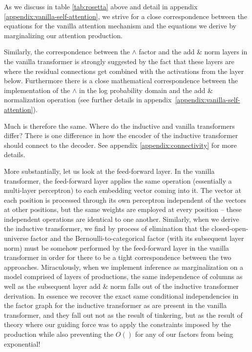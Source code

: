 \documentclass{article}
\begin{document}
As we discuss in table \ref{tab:rosetta} above and detail in appendix \ref{appendix:vanilla-self-attention}, we strive for a close correspondence between the equations for the vanilla attention mechanism and the equations we derive by marginalizing our attention production.

Similarly, the correspondence between the $\land$ factor and the add \& norm layers in the vanilla transformer is strongly suggested by the fact that these layers are where the residual connections get combined with the activations from the layer below.  Furthermore there is a close mathematical correspondence between the implementation of the $\land$ in the log probability domain and the add \& normalization operation (see further details in appendix~\ref{appendix:vanilla-self-attention}).

Much is therefore the same.  Where do the inductive and vanilla transformers differ?  There is one difference in how the encoder of the inductive transformer should connect to the decoder. See appendix \ref{appendix:connectivity} for more details.

More substantially, let us look at the feed-forward layer.  In the vanilla transformer, the feed-forward layer applies the same operation (essentially a multi-layer perceptron) to each embedding vector coming into it.  The vector at each position is processed through its own perceptron independent of the vectors at other positions, but the same weights are employed at every position -- these independent operations are identical to one another.  Similarly, when we derive the inductive transformer, we find by process of elimination that the closed-open-universe factor and the Bernoulli-to-categorical factor (with its subsequent layer norm) must be somehow performed by the feed-forward layer in the vanilla transformer in order for there to be a tight correspondence between the two approaches.  Miraculously, when we implement inference as marginalization on a model comprised of layers of productions, the same independence of columns as well as the subsequent layer add \& norm falls out of the inductive transformer derivation.  In essence we recover the exact same conditional independencies in the factor graph for the inductive transformer as are present in the vanilla transformer, and they fall out not as the result of tinkering, but as the result of theory where our guiding force was to apply the constraints imposed by the production while also preventing the $O()$ for any of our factors from being exponential!
\end{document}
